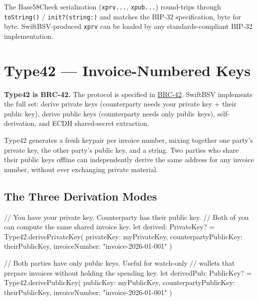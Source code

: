 \documentclass[a4paper, 11pt, openany]{book}
\begin{document}
The Base58Check serialization (\texttt{xprv...}, \texttt{xpub...}) round-trips through \texttt{toString()} / \texttt{init?(string:)} and matches the BIP-32 specification, byte for byte. SwiftBSV-produced \texttt{xprv} can be loaded by any standards-compliant BIP-32 implementation.

\chapter{Type42 — Invoice-Numbered Keys}

\begin{notebox}
\textbf{Type42 is BRC-42.} The protocol is specified in \href{https://bsv.brc.dev/key-derivation/0042}{BRC-42}. SwiftBSV implements the full set: derive private keys (counterparty needs your private key + their public key), derive public keys (counterparty needs only public keys), self-derivation, and ECDH shared-secret extraction.
\end{notebox}

Type42 generates a fresh keypair per invoice number, mixing together one party's private key, the other party's public key, and a string. Two parties who share their public keys offline can independently derive the same address for any invoice number, without ever exchanging private material.

\section{The Three Derivation Modes}

\begin{forthbox}
// You have your private key. Counterparty has their public key.
// Both of you can compute the same shared invoice key.
let derived: PrivateKey? = Type42.derivePrivateKey(
    privateKey: myPrivateKey,
    counterpartyPublicKey: theirPublicKey,
    invoiceNumber: "invoice-2026-01-001"
)
\end{forthbox}

\begin{forthbox}
// Both parties have only public keys. Useful for watch-only
// wallets that prepare invoices without holding the spending key.
let derivedPub: PublicKey? = Type42.derivePublicKey(
    publicKey: myPublicKey,
    counterpartyPublicKey: theirPublicKey,
    invoiceNumber: "invoice-2026-01-001"
)
\end{forthbox}
\end{document}
